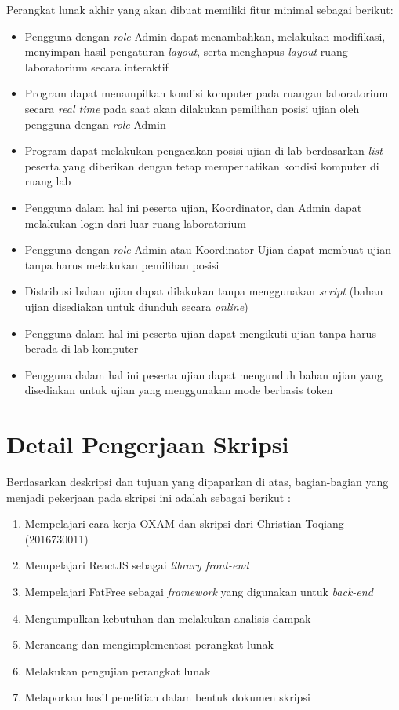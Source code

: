 \documentclass[a4paper,twoside]{article}
\begin{document}
Perangkat lunak akhir yang akan dibuat memiliki fitur minimal sebagai berikut:
\begin{itemize}
	
	\item Pengguna dengan \textit{role} Admin dapat menambahkan, melakukan modifikasi, menyimpan hasil pengaturan \textit{layout}, serta menghapus \textit{layout} ruang laboratorium secara interaktif
	\item Program dapat menampilkan kondisi komputer pada ruangan laboratorium secara \textit{real time} pada saat akan dilakukan pemilihan posisi ujian oleh pengguna dengan \textit{role} Admin
	\item Program dapat melakukan pengacakan posisi ujian di lab berdasarkan \textit{list} peserta yang diberikan dengan tetap memperhatikan kondisi komputer di ruang lab
    \item Pengguna dalam hal ini peserta ujian, Koordinator, dan Admin dapat melakukan login dari luar ruang laboratorium
	\item Pengguna dengan \textit{role} Admin atau Koordinator Ujian dapat membuat ujian tanpa harus melakukan pemilihan posisi
    \item Distribusi bahan ujian dapat dilakukan tanpa menggunakan \textit{script} (bahan ujian disediakan untuk diunduh secara \textit{online})
	\item Pengguna dalam hal ini peserta ujian dapat mengikuti ujian tanpa harus berada di lab komputer
	\item Pengguna dalam hal ini peserta ujian dapat mengunduh bahan ujian yang disediakan untuk ujian yang menggunakan mode berbasis token
	
		
\end{itemize}

\section{Detail Pengerjaan Skripsi}
Berdasarkan deskripsi dan tujuan yang dipaparkan di atas, bagian-bagian yang menjadi pekerjaan pada skripsi ini adalah sebagai berikut :
	\begin{enumerate}
	\item Mempelajari cara kerja OXAM dan skripsi dari Christian Toqiang (2016730011)
	\item Mempelajari ReactJS sebagai \textit{library front-end}
	\item Mempelajari FatFree  sebagai \textit{framework} yang digunakan untuk \textit{back-end}
	\item Mengumpulkan kebutuhan dan melakukan analisis dampak
	\item Merancang dan mengimplementasi perangkat lunak
	\item Melakukan pengujian perangkat lunak
	\item Melaporkan hasil penelitian dalam bentuk dokumen skripsi
	\end{enumerate}
\end{document}
